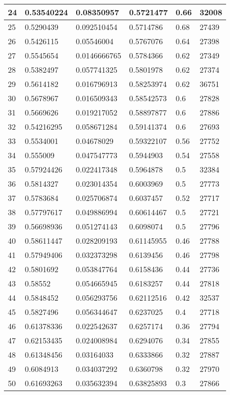 \begin{longtable}{|l|l|l|l|l|l|}
24 & 0.53540224 & 0.08350957 & 0.5721477 & 0.66 & 32008 \\ \hline 
25 & 0.5290439 & 0.092510454 & 0.5714786 & 0.68 & 27439 \\ \hline 
26 & 0.5426115 & 0.05546004 & 0.5767076 & 0.64 & 27398 \\ \hline 
27 & 0.5545654 & 0.0146666765 & 0.5784366 & 0.62 & 27349 \\ \hline 
28 & 0.5382497 & 0.057741325 & 0.5801978 & 0.62 & 27374 \\ \hline 
29 & 0.5614182 & 0.016796913 & 0.58253974 & 0.62 & 36751 \\ \hline 
30 & 0.5678967 & 0.016509343 & 0.58542573 & 0.6 & 27828 \\ \hline 
31 & 0.5669626 & 0.019217052 & 0.58897877 & 0.6 & 27886 \\ \hline 
32 & 0.54216295 & 0.058671284 & 0.59141374 & 0.6 & 27693 \\ \hline 
33 & 0.5534001 & 0.04678029 & 0.59322107 & 0.56 & 27752 \\ \hline 
34 & 0.555009 & 0.047547773 & 0.5944903 & 0.54 & 27558 \\ \hline 
35 & 0.57924426 & 0.022417348 & 0.5964878 & 0.5 & 32384 \\ \hline 
36 & 0.5814327 & 0.023014354 & 0.6003969 & 0.5 & 27773 \\ \hline 
37 & 0.5783684 & 0.025706874 & 0.6037457 & 0.52 & 27717 \\ \hline 
38 & 0.57797617 & 0.049886994 & 0.60614467 & 0.5 & 27721 \\ \hline 
39 & 0.56698936 & 0.051274143 & 0.6098074 & 0.5 & 27796 \\ \hline 
40 & 0.58611447 & 0.028209193 & 0.61145955 & 0.46 & 27788 \\ \hline 
41 & 0.57949406 & 0.032373298 & 0.6139456 & 0.46 & 27798 \\ \hline 
42 & 0.5801692 & 0.053847764 & 0.6158436 & 0.44 & 27736 \\ \hline 
43 & 0.58552 & 0.054665945 & 0.6183257 & 0.44 & 27818 \\ \hline 
44 & 0.5848452 & 0.056293756 & 0.62112516 & 0.42 & 32537 \\ \hline 
45 & 0.5827496 & 0.056344647 & 0.6237025 & 0.4 & 27718 \\ \hline 
46 & 0.61378336 & 0.022542637 & 0.6257174 & 0.36 & 27794 \\ \hline 
47 & 0.62153435 & 0.024008984 & 0.6294076 & 0.34 & 27855 \\ \hline 
48 & 0.61348456 & 0.03164033 & 0.6333866 & 0.32 & 27887 \\ \hline 
49 & 0.6084913 & 0.034037292 & 0.6360798 & 0.32 & 27970 \\ \hline 
50 & 0.61693263 & 0.035632394 & 0.63825893 & 0.3 & 27866 \\ \hline 
\end{longtable}